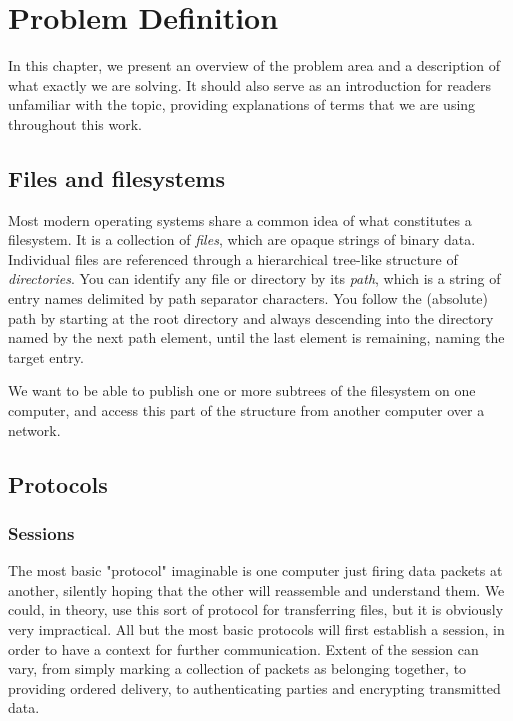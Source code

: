 
\chapter{Problem Definition}

In this chapter, we present an overview of the problem area and a description of what exactly we are solving.
It should also serve as an introduction for readers unfamiliar with the topic, providing explanations of terms
that we are using throughout this work.


\section{Files and filesystems}

Most modern operating systems share a common idea of what constitutes a filesystem. It is a collection of {\it
files}, which are opaque strings of binary data. Individual files are referenced through a hierarchical
tree-like structure of {\it directories}.  You can identify any file or directory by its {\it path}, which is
a string of entry names delimited by path separator characters\footnotemark[1]. You follow the (absolute) path
by starting at the root directory and always descending into the directory named by the next path element,
until the last element is remaining, naming the target entry.

We want to be able to publish one or more subtrees of the filesystem on one computer, and access this part of
the structure from another computer over a network.


\section{Protocols}


\subsection{Sessions}

The most basic "protocol" imaginable is one computer just firing data packets at another, silently hoping that
the other will reassemble and understand them. We could, in theory, use this sort of protocol for transferring
files, but it is obviously very impractical. All but the most basic protocols will first establish a session,
in order to have a context for further communication. Extent of the session can vary, from simply marking
a collection of packets as belonging together, to providing ordered delivery, to authenticating parties and
encrypting transmitted data.

